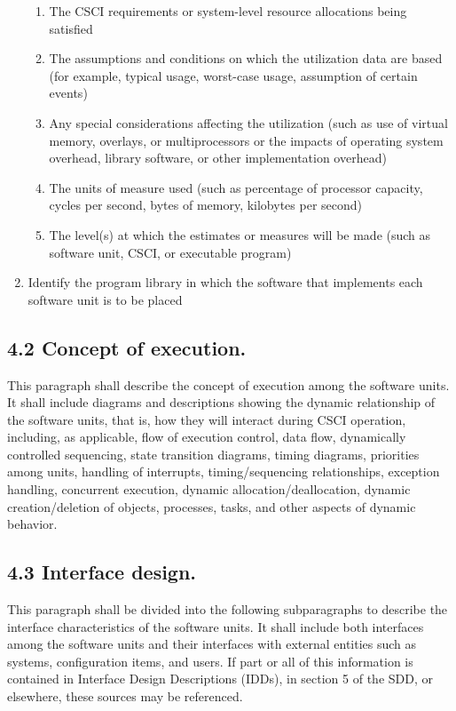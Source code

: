 \begin{enumerate}
  \begin{enumerate}
  \itemsep1pt\parskip0pt
  \item
    The CSCI requirements or system-level resource allocations being
    satisfied
  \item
    The assumptions and conditions on which the utilization data are
    based (for example, typical usage, worst-case usage, assumption of
    certain events)
  \item
    Any special considerations affecting the utilization (such as use of
    virtual memory, overlays, or multiprocessors or the impacts of
    operating system overhead, library software, or other implementation
    overhead)
  \item
    The units of measure used (such as percentage of processor capacity,
    cycles per second, bytes of memory, kilobytes per second)
  \item
    The level(s) at which the estimates or measures will be made (such
    as software unit, CSCI, or executable program)
  \end{enumerate}
\item
  Identify the program library in which the software that implements
  each software unit is to be placed
\end{enumerate}

\subsection{4.2 Concept of execution.}

This paragraph shall describe the concept of execution among the
software units. It shall include diagrams and descriptions showing the
dynamic relationship of the software units, that is, how they will
interact during CSCI operation, including, as applicable, flow of
execution control, data flow, dynamically controlled sequencing, state
transition diagrams, timing diagrams, priorities among units, handling
of interrupts, timing/sequencing relationships, exception handling,
concurrent execution, dynamic allocation/deallocation, dynamic
creation/deletion of objects, processes, tasks, and other aspects of
dynamic behavior.

\subsection{4.3 Interface design.}

This paragraph shall be divided into the following subparagraphs to
describe the interface characteristics of the software units. It shall
include both interfaces among the software units and their interfaces
with external entities such as systems, configuration items, and users.
If part or all of this information is contained in Interface Design
Descriptions (IDDs), in section 5 of the SDD, or elsewhere, these
sources may be referenced.

